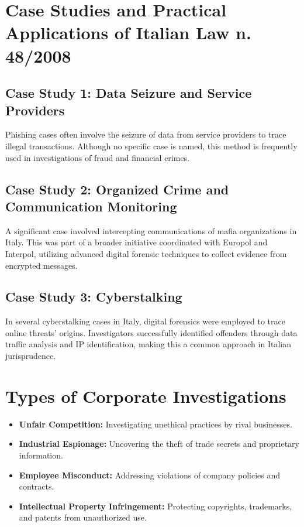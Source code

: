 \section{Case Studies and Practical Applications of Italian Law n. 48/2008}

\subsection{Case Study 1: Data Seizure and Service Providers}
Phishing cases often involve the seizure of data from service providers to trace illegal transactions. Although no specific case is named, this method is frequently used in investigations of fraud and financial crimes.

\subsection{Case Study 2: Organized Crime and Communication Monitoring}
A significant case involved intercepting communications of mafia organizations in Italy. This was part of a broader initiative coordinated with Europol and Interpol, utilizing advanced digital forensic techniques to collect evidence from encrypted messages.

\subsection{Case Study 3: Cyberstalking}
In several cyberstalking cases in Italy, digital forensics were employed to trace online threats' origins. Investigators successfully identified offenders through data traffic analysis and IP identification, making this a common approach in Italian jurisprudence.

\section{Types of Corporate Investigations}
\begin{itemize}
    \item \textbf{Unfair Competition:} Investigating unethical practices by rival businesses.
    \item \textbf{Industrial Espionage:} Uncovering the theft of trade secrets and proprietary information.
    \item \textbf{Employee Misconduct:} Addressing violations of company policies and contracts.
    \item \textbf{Intellectual Property Infringement:} Protecting copyrights, trademarks, and patents from unauthorized use.
\end{itemize}

